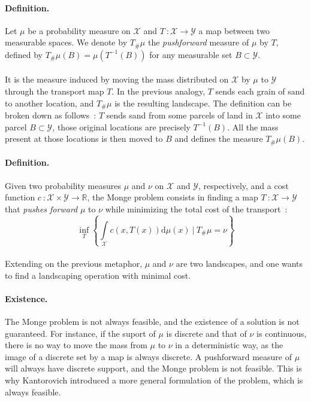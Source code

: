 \documentclass[a4paper,11pt]{article}
\newcommand{\R}{\mathbb{R}}
\newcommand{\1}{\mathbbm{1}}
\begin{document}
\paragraph{Definition.}Let $\mu$ be a probability measure on $\mathcal{X}$ and $T~: \mathcal{X} \rightarrow \mathcal{Y}$ a map between two measurable spaces. We denote by $T_{\#}\mu$ the \emph{pushforward} measure of $\mu$ by $T$, defined by $T_{\#}\mu(B) = \mu(T^{-1}(B))$ for any measurable set $B \subset \mathcal{Y}$.

\paragraph{}It is the measure induced by moving the mass distributed on $\mathcal{X}$ by $\mu$ to $\mathcal{Y}$ through the transport map $T$. In the previous analogy, $T$ sends each grain of sand to another location, and $T_{\#}\mu$ is the resulting landscape. The definition can be broken down as follows~: $T$ sends sand from some parcels of land in $\mathcal{X}$ into some parcel $B \subset \mathcal{Y}$, those original locations are precisely $T^{-1}(B)$. All the mass present at those locations is then moved to $B$ and defines the measure $T_{\#}\mu(B)$.

\paragraph{Definition.}Given two probability measures $\mu$ and $\nu$ on $\mathcal{X}$ and $\mathcal{Y}$, respectively, and a cost function $c~: \mathcal{X} \times \mathcal{Y} \rightarrow \R$, the Monge problem consists in finding a map $T~: \mathcal{X} \rightarrow \mathcal{Y}$ that \emph{pushes forward} $\mu$ to $\nu$ while minimizing the total cost of the transport~:
\begin{equation}
    \inf_{T} \left\{\int\limits_{\mathcal{X}} c(x, T(x)) \mathrm{d}\mu(x)~|~T_{\#}\mu = \nu\right\}
\end{equation}

\paragraph{}Extending on the previous metaphor, $\mu$ and $\nu$ are two landscapes, and one wants to find a landscaping operation with minimal cost.

\paragraph{Existence.}The Monge problem is not always feasible, and the existence of a solution is not guaranteed. For instance, if the suport of $\mu$ is discrete and that of $\nu$ is continuous, there is no way to move the mass from $\mu$ to $\nu$ in a deterministic way, as the image of a discrete set by a map is always discrete. A pushforward measure of $\mu$ will always have discrete support, and the Monge problem is not feasible. This is why Kantorovich introduced a more general formulation of the problem, which is always feasible.
\end{document}
